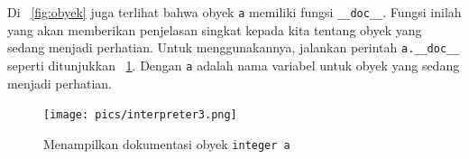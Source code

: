 Di \figurename~\ref{fig:obyek} juga terlihat bahwa obyek \texttt{a} memiliki fungsi \texttt{\_\_doc\_\_}. Fungsi inilah yang akan memberikan penjelasan singkat kepada kita tentang obyek yang sedang menjadi perhatian. Untuk menggunakannya, jalankan perintah \texttt{a.\_\_doc\_\_} seperti ditunjukkan \figurename~\ref{fig:doc}. Dengan \texttt{a} adalah nama variabel untuk obyek yang sedang menjadi perhatian.

\begin{figure}[h!]
  \begin{center}
    \texttt{[image: pics/interpreter3.png]}
    \caption{Menampilkan dokumentasi obyek \texttt{integer a}}
    \label{fig:doc}
  \end{center}
\end{figure}
